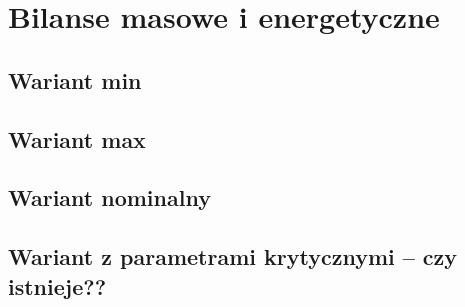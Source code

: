 \section{Bilanse masowe i energetyczne }

\subsection{Wariant min}

\subsection{Wariant max}

\subsection{Wariant nominalny}

\subsection{Wariant z parametrami krytycznymi – czy istnieje??}